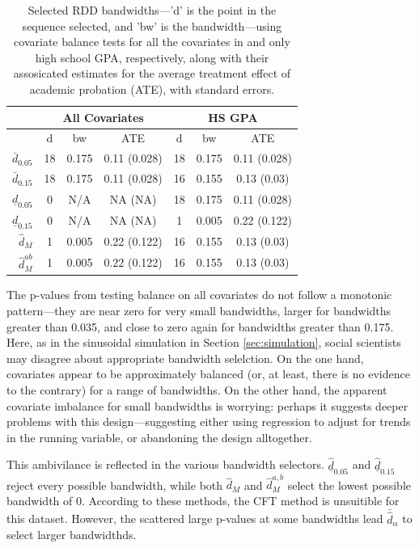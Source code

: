 \documentclass[12pt]{article}\usepackage[]{graphicx}\usepackage[]{color}
\newcommand{\dalphaU}{\bar{\hat{d}}_\alpha}
\newcommand{\dhat}{\hat{d}}
\newcommand{\dhatB}{\underline{\hat{d}}}
\newcommand{\dhatm}{\hat{d}_M}
\newcommand{\dhatmab}{\hat{d}^{ab}_M}
\begin{document}
\begin{table}[ht]
\centering
\begin{tabular}{r|ccc|ccc|}
  & \multicolumn{3}{c}{All Covariates}&\multicolumn{3}{c}{HS GPA}\\
 \hline
 & d & bw & ATE & d & bw & ATE \\ 
  \hline
$\bar{d}_{0.05}$ & 18 & 0.175 & 0.11 (0.028) & 18 & 0.175 & 0.11 (0.028) \\ 
  $\bar{d}_{0.15}$ & 18 & 0.175 & 0.11 (0.028) & 16 & 0.155 & 0.13 (0.03) \\ 
  $\underline{d}_{0.05}$ & 0 & N/A & NA (NA) & 18 & 0.175 & 0.11 (0.028) \\ 
  $\underline{d}_{0.15}$ & 0 & N/A & NA (NA) & 1 & 0.005 & 0.22 (0.122) \\ 
  $\dhatm$ & 1 & 0.005 & 0.22 (0.122) & 16 & 0.155 & 0.13 (0.03) \\ 
  $\dhatmab$ & 1 & 0.005 & 0.22 (0.122) & 16 & 0.155 & 0.13 (0.03) \\ 
   \hline
\end{tabular}
\caption{Selected RDD bandwidths---'d' is the point in the sequence selected, and 'bw' is the bandwidth---using covariate balance tests for all the covariates in \citet{lso} and only high school GPA, respectively, along with their assosicated estimates for the average treatment effect of academic probation (ATE), with standard errors.} 
\label{tab:RDD}
\end{table}


The p-values from testing balance on all covariates do not follow a
monotonic pattern---they are near zero for very small bandwidths,
larger for bandwidths greater than 0.035, and close to zero again for
bandwidths greater than 0.175.
Here, as in the sinusoidal simulation in Section \ref{sec:simulation},
social scientists may disagree about appropriate bandwidth selelction.
On the one hand, covariates appear to be approximately balanced (or,
at least, there is no evidence to the contrary) for a range of
bandwidths.
On the other hand, the apparent covariate imbalance for small
bandwidths is worrying: perhaps it suggests deeper problems with this
design---suggesting either using regression to adjust for trends in
the running variable, or abandoning the design alltogether.

This ambivilance is reflected in the various bandwidth selectors.
$\dhatB_{0.05}$ and $\dhatB_{0.15}$ reject every possible bandwidth, while
both $\dhatm$ and $\dhat_M^{a,b}$ select the lowest possible
bandwidth of 0.
According to these methods, the CFT method is unsuitible for this
dataset.
However, the scattered large p-values at some bandwidths lead
 $\dalphaU$ to select larger bandwidthds.
\end{document}
